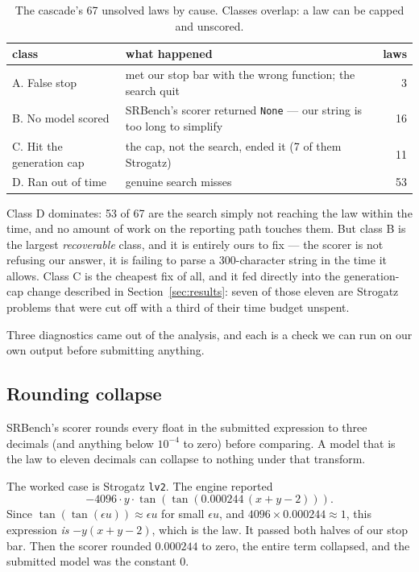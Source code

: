 \documentclass[11pt,a4paper]{article}
\begin{document}
\begin{table}[htbp]
\centering
\begin{tabular}{p{4cm}p{7.5cm}r}
\toprule
class & what happened & laws \\
\midrule
A. False stop & met our stop bar with the wrong function; the search quit & 3 \\
B. No model scored & SRBench's scorer returned \texttt{None} --- our string is too long to simplify & 16 \\
C. Hit the generation cap & the cap, not the search, ended it (7 of them Strogatz) & 11 \\
D. Ran out of time & genuine search misses & 53 \\
\bottomrule
\end{tabular}
\caption{The cascade's 67 unsolved laws by cause. Classes overlap: a law can be
capped and unscored.}
\label{tab:failure}
\end{table}

Class D dominates: 53 of 67 are the search simply not reaching the law within
the time, and no amount of work on the reporting path touches them. But class B
is the largest \emph{recoverable} class, and it is entirely ours to fix --- the
scorer is not refusing our answer, it is failing to parse a 300-character string
in the time it allows. Class C is the cheapest fix of all, and it fed directly
into the generation-cap change described in Section~\ref{sec:results}: seven of
those eleven are Strogatz problems that were cut off with a third of their time
budget unspent.

Three diagnostics came out of the analysis, and each is a check we can run on our
own output before submitting anything.

\subsection{Rounding collapse}

SRBench's scorer rounds every float in the submitted expression to three decimals
(and anything below $10^{-4}$ to zero) before comparing. A model that is the law
to eleven decimals can collapse to nothing under that transform.

The worked case is Strogatz \texttt{lv2}. The engine reported
\[
-4096 \cdot y \cdot \tan(\tan(0.000244\,(x + y - 2))).
\]
Since $\tan(\tan(\epsilon u)) \approx \epsilon u$ for small $\epsilon u$, and
$4096 \times 0.000244 \approx 1$, this expression \emph{is}
$-y(x+y-2)$, which is the law. It passed both halves of our stop bar. Then the
scorer rounded $0.000244$ to zero, the entire term collapsed, and the submitted
model was the constant $0$.
\end{document}
